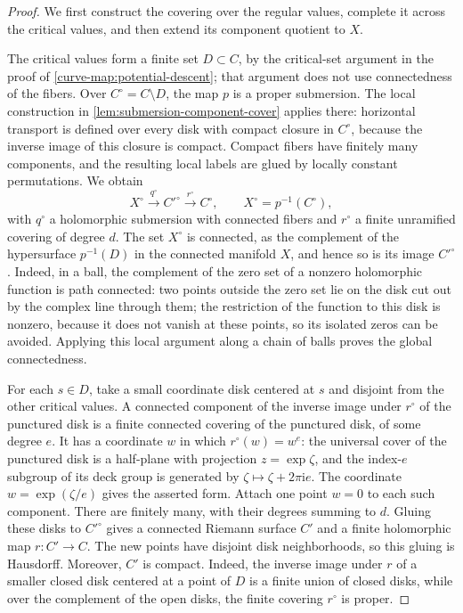 \begin{proof}
We first construct the covering over the regular values,
complete it across the critical values, and then extend its
component quotient to $X$.

The critical values form a finite set $D\subset C$, by the
critical-set argument in the proof of
\cref{curve-map:potential-descent}; that argument does not use
connectedness of the fibers. Over $C^\circ=C\setminus D$, the
map $p$ is a proper submersion. The local construction in
\cref{lem:submersion-component-cover} applies there: horizontal
transport is defined over every disk with compact closure in
$C^\circ$, because the inverse image of this closure is compact.
Compact fibers have finitely many components, and
the resulting local labels are glued by locally constant
permutations. We obtain
\[
 X^\circ\xrightarrow{q^\circ}C'^\circ
             \xrightarrow{r^\circ}C^\circ,
 \qquad X^\circ=p^{-1}(C^\circ),
\]
with $q^\circ$ a holomorphic submersion with connected fibers
and $r^\circ$ a finite unramified covering of degree $d$.
The set $X^\circ$ is connected, as the complement of the
hypersurface $p^{-1}(D)$ in the connected manifold $X$, and
hence so is its image $C'^\circ$. Indeed, in a ball, the complement
of the zero set of a nonzero holomorphic function is
path connected: two points outside the zero set lie on the
disk cut out by the complex line through them; the restriction
of the function to this disk is nonzero, because it does not
vanish at these points, so its isolated zeros can be avoided.
Applying this local argument along a chain of balls proves the
global connectedness.

For each $s\in D$, take a small coordinate disk centered at
$s$ and disjoint from the other critical values. A connected
component of the inverse image under $r^\circ$ of the punctured
disk is a finite connected covering of the punctured disk, of
some degree $e$.
It has a coordinate $w$ in which $r^\circ(w)=w^e$: the
universal cover of the punctured disk is a half-plane with
projection $z=\exp\zeta$, and the index-$e$ subgroup of its
deck group is generated by $\zeta\mapsto\zeta+2\pi\mathrm i e$.
The coordinate $w=\exp(\zeta/e)$ gives the asserted form.
Attach one point $w=0$ to each such component. There are
finitely many, with their degrees summing to $d$. Gluing these
disks to $C'^\circ$ gives a connected Riemann surface $C'$ and
a finite holomorphic map $r\colon C'\to C$. The new points have
disjoint disk neighborhoods, so this gluing is Hausdorff.
Moreover, $C'$ is compact. Indeed, the inverse image under $r$
of a smaller closed disk centered at a point of $D$ is a finite
union of closed disks, while over the complement of the open
disks, the finite covering $r^\circ$ is proper.


\end{proof}
